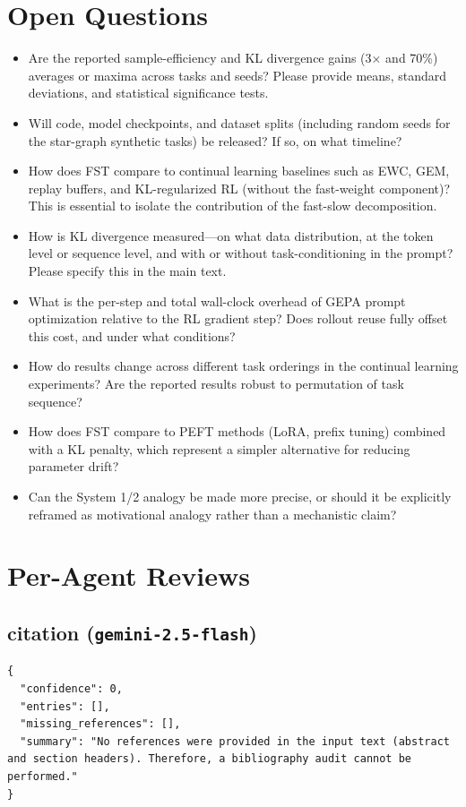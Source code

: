 \documentclass[11pt]{article}
\begin{document}
\section*{Open Questions}
\begin{itemize}[leftmargin=*]
  \item Are the reported sample-efficiency and KL divergence gains (3× and 70\%) averages or maxima across tasks and seeds? Please provide means, standard deviations, and statistical significance tests.
  \item Will code, model checkpoints, and dataset splits (including random seeds for the star-graph synthetic tasks) be released? If so, on what timeline?
  \item How does FST compare to continual learning baselines such as EWC, GEM, replay buffers, and KL-regularized RL (without the fast-weight component)? This is essential to isolate the contribution of the fast-slow decomposition.
  \item How is KL divergence measured—on what data distribution, at the token level or sequence level, and with or without task-conditioning in the prompt? Please specify this in the main text.
  \item What is the per-step and total wall-clock overhead of GEPA prompt optimization relative to the RL gradient step? Does rollout reuse fully offset this cost, and under what conditions?
  \item How do results change across different task orderings in the continual learning experiments? Are the reported results robust to permutation of task sequence?
  \item How does FST compare to PEFT methods (LoRA, prefix tuning) combined with a KL penalty, which represent a simpler alternative for reducing parameter drift?
  \item Can the System 1/2 analogy be made more precise, or should it be explicitly reframed as motivational analogy rather than a mechanistic claim?
\end{itemize}

\section*{Per-Agent Reviews}
\subsection*{citation (\texttt{gemini-2.5-flash})}
\begin{verbatim}
{
  "confidence": 0,
  "entries": [],
  "missing_references": [],
  "summary": "No references were provided in the input text (abstract and section headers). Therefore, a bibliography audit cannot be performed."
}
\end{verbatim}
\end{document}
